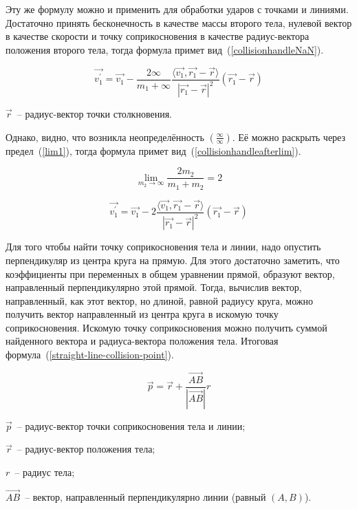 Эту же формулу можно и применить для обработки ударов с точками и линиями. Достаточно принять бесконечность в качестве массы второго тела,
нулевой вектор в качестве скорости и точку соприкосновения в качестве радиус-вектора положения второго тела, тогда формула примет вид~(\ref{collisionhandleNaN}).

\begin{equation}\label{collisionhandleNaN}
  \vec{v_1^\prime} = \vec{v_1} - \frac{2 \infty}{m_1 + \infty}
  \frac{\langle \vec{v_1}, \vec{r_1} - \vec{r} \rangle }{\left| \vec{r_1} - \vec{r} \right|^2}
  (\vec{r_1} - \vec{r})
\end{equation}

\begin{Underequation}
  \(\vec{r}\)~-- радиус-вектор точки столкновения.
\end{Underequation}

Однако, видно, что возникла неопределённость \((\frac{\infty}{\infty})\). Её можно раскрыть через предел~(\ref{lim1}),
тогда формула примет вид~(\ref{collisionhandleafterlim}).

\begin{equation}\label{lim1}
  \lim_{m_2 \to \infty} \frac{2 m_2}{m_1 + m_2} = 2
\end{equation}

\begin{equation}\label{collisionhandleafterlim}
  \vec{v_1^\prime} = \vec{v_1} - 2
  \frac{\langle \vec{v_1}, \vec{r_1} - \vec{r} \rangle }{\left| \vec{r_1} - \vec{r} \right|^2}
  (\vec{r_1} - \vec{r})
\end{equation}

Для того чтобы найти точку соприкосновения тела и линии, надо опустить перпендикуляр из центра круга на прямую.
Для этого достаточно заметить, что коэффициенты при переменных в общем уравнении прямой,
образуют вектор, направленный перпендикулярно этой прямой. Тогда, вычислив вектор, направленный, как этот вектор, но
длиной, равной радиусу круга, можно получить вектор направленный из центра круга в искомую точку соприкосновения.
Искомую точку соприкосновения можно получить суммой найденного вектора и радиуса-вектора положения тела.
Итоговая формула~(\ref{straight-line-collision-point}).

\begin{equation}\label{straight-line-collision-point}
  \vec{p} = \vec{r} + \frac{\vec{AB}}{\left|\vec{AB}\right|} r
\end{equation}

\begin{Underequation}
  \(\vec{p}\)~-- радиус-вектор точки соприкосновения тела и линии;

  \(\vec{r}\)~-- радиус-вектор положения тела;

  \(r\)~-- радиус тела;

  \(\vec{AB}\)~-- вектор, направленный перпендикулярно линии (равный \((A, B)\)).
\end{Underequation}

